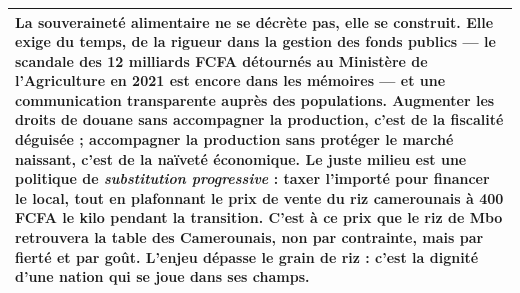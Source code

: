 \documentclass[11pt]{article}
\begin{document}
\begin{center}
\begin{tabularx}{\linewidth}{|X|}
La souveraineté alimentaire ne se décrète pas, elle se construit. Elle exige du temps, de la rigueur dans la gestion des fonds publics — le scandale des 12 milliards FCFA détournés au Ministère de l'Agriculture en 2021 est encore dans les mémoires — et une communication transparente auprès des populations. Augmenter les droits de douane sans accompagner la production, c'est de la fiscalité déguisée ; accompagner la production sans protéger le marché naissant, c'est de la naïveté économique. Le juste milieu est une politique de \emph{substitution progressive} : taxer l'importé pour financer le local, tout en plafonnant le prix de vente du riz camerounais à 400 FCFA le kilo pendant la transition. C'est à ce prix que le riz de Mbo retrouvera la table des Camerounais, non par contrainte, mais par fierté et par goût. L'enjeu dépasse le grain de riz : c'est la dignité d'une nation qui se joue dans ses champs. \\ \hline
\end{tabularx}
\end{center}
\end{document}
